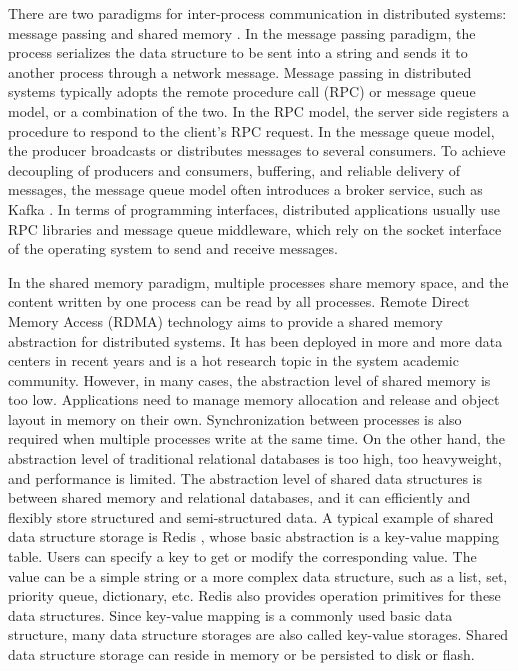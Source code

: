 There are two paradigms for inter-process communication in distributed systems: message passing and shared memory \cite{kshemkalyani2011distributed}. In the message passing paradigm, the process serializes the data structure to be sent into a string and sends it to another process through a network message. Message passing in distributed systems typically adopts the remote procedure call (RPC) or message queue model, or a combination of the two. In the RPC model, the server side registers a procedure to respond to the client's RPC request. In the message queue model, the producer broadcasts or distributes messages to several consumers. To achieve decoupling of producers and consumers, buffering, and reliable delivery of messages, the message queue model often introduces a broker service, such as Kafka \cite{kreps2011kafka}. In terms of programming interfaces, distributed applications usually use RPC libraries and message queue middleware, which rely on the socket interface of the operating system to send and receive messages.

In the shared memory paradigm, multiple processes share memory space, and the content written by one process can be read by all processes. Remote Direct Memory Access (RDMA) technology aims to provide a shared memory abstraction for distributed systems. It has been deployed in more and more data centers in recent years and is a hot research topic in the system academic community. However, in many cases, the abstraction level of shared memory is too low. Applications need to manage memory allocation and release and object layout in memory on their own. Synchronization between processes is also required when multiple processes write at the same time. On the other hand, the abstraction level of traditional relational databases is too high, too heavyweight, and performance is limited. The abstraction level of shared data structures is between shared memory and relational databases, and it can efficiently and flexibly store structured and semi-structured data. A typical example of shared data structure storage is Redis \cite{redis}, whose basic abstraction is a key-value mapping table. Users can specify a key to get or modify the corresponding value. The value can be a simple string or a more complex data structure, such as a list, set, priority queue, dictionary, etc. Redis also provides operation primitives for these data structures. Since key-value mapping is a commonly used basic data structure, many data structure storages are also called key-value storages. Shared data structure storage can reside in memory or be persisted to disk or flash.

